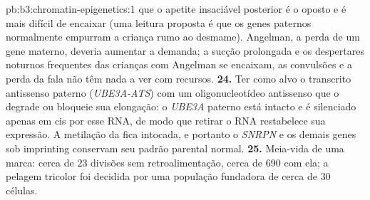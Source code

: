 \begin{solution}{pb:b3:chromatin-epigenetics:1}
que o apetite insaciável posterior é o oposto e é mais difícil de
encaixar (uma leitura proposta é que os genes paternos normalmente
empurram a criança rumo ao desmame). Angelman, a perda de um gene
materno, deveria aumentar a demanda; a sucção prolongada e os despertares
noturnos frequentes das crianças com Angelman se encaixam, as convulsões
e a perda da fala não têm nada a ver com recursos.
\textbf{24.} Ter como alvo o transcrito antissenso paterno
(\emph{UBE3A-ATS}) com um oligonucleotídeo antissenso que o degrade ou
bloqueie sua elongação: o \emph{UBE3A} paterno está intacto e é
silenciado apenas em cis por esse RNA, de modo que retirar o RNA
restabelece sua expressão. A metilação da  fica intocada, e portanto o \emph{SNRPN} e os demais genes
sob imprinting conservam seu padrão parental normal.
\textbf{25.} Meia-vida de uma marca: cerca de $23$ divisões sem
retroalimentação, cerca de $690$ com ela; a pelagem tricolor foi
decidida por uma população fundadora de cerca de $30$ células.
\end{solution}
